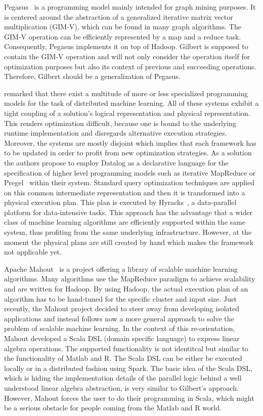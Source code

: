 Pegasus~\cite{kang:2009a} is a programming model mainly intended for graph mining purposes.
It is centered around the abstraction of a generalized iterative matrix vector multiplication (GIM-V), which can be found in many graph algorithms.
The GIM-V operation can be efficiently represented by a map and a reduce task.
Consequently, Pegasus implements it on top of Hadoop.
Gilbert is supposed to contain the GIM-V operation and will not only consider the operation itself for optimization purposes but also its context of previous and succeeding operations.
Therefore, Gilbert should be a generalization of Pegasus.

\Textcite{bu:apa2012a} remarked that there exist a multitude of more or less specialized programming models for the task of distributed machine learning.
All of these systems exhibit a tight coupling of a solution's logical representation and physical representation.
This renders optimization difficult, because one is bound to the underlying runtime implementation and disregards alternative execution strategies.
Moreover, the systems are mostly disjoint which implies that each framework has to be updated in order to profit from new optimization strategies.
As a solution the authors propose to employ Datalog as a declarative language for the specification of higher level programming models such as iterative MapReduce or Pregel~\cite{malewicz:2010a} within their system.
Standard query optimization techniques are applied on this common intermediate representation and then it is transformed into a physical execution plan.
This plan is executed by Hyracks~\cite{borkar:2011a}, a data-parallel platform for data-intensive tasks.
This approach has the advantage that a wider class of machine learning algorithms are efficiently supported within the same system, thus profiting from the same underlying infrastructure.
However, at the moment the physical plans are still created by hand which makes the framework not applicable yet.

Apache Mahout~\cite{mahout:2011a} is a project offering a library of scalable machine learning algorithms.
Many algorithms use the MapReduce paradigm to achieve scalability and are written for Hadoop.
By using Hadoop, the actual execution plan of an algorithm has to be hand-tuned for the specific cluster and input size.
Just recently, the Mahout project decided to steer away from developing isolated applications and instead follows now a more general approach to solve the problem of scalable machine learning.
In the context of this re-orientation, Mahout developed a Scala DSL (domain specific language) to express linear algebra operations.
The supported functionality is not identitcal but similar to the functionality of Matlab and R.
The Scala DSL can be either be executed locally or in a distributed fashion using Spark.
The basic idea of the Scala DSL, which is hiding the implementation details of the parallel logic behind a well understood linear algebra abstraction, is very similar to Gilbert's approach.
However, Mahout forces the user to do their programming in Scala, which might be a serious obstacle for people coming from the Matlab and R world. 

